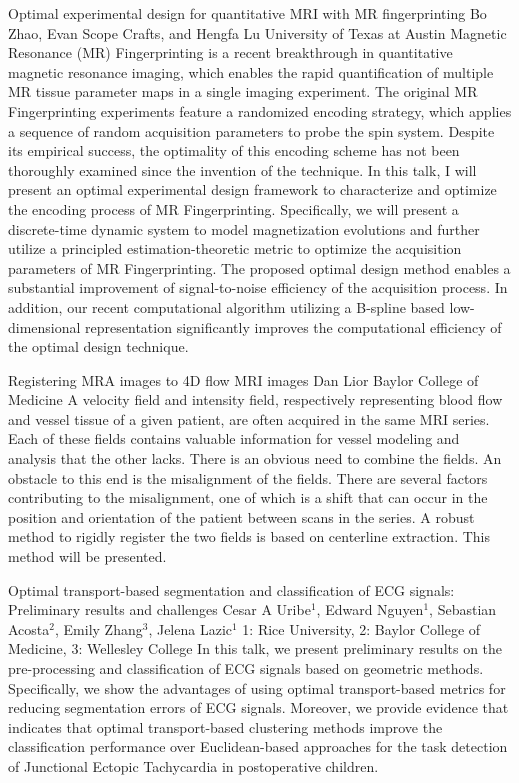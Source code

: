 \begin{addmargin}[2em]{0em}
\vspace{1.5ex}
\abs
{Optimal experimental design for quantitative MRI with MR fingerprinting}
{Bo Zhao, Evan Scope Crafts, and Hengfa Lu}
{University of Texas at Austin}
{Magnetic Resonance (MR) Fingerprinting is a recent breakthrough in quantitative magnetic resonance imaging, which enables the rapid quantification of multiple MR tissue parameter maps in a single imaging experiment. The original MR Fingerprinting experiments feature a randomized encoding strategy, which applies a sequence of random acquisition parameters to probe the spin system. Despite its empirical success, the optimality of this encoding scheme has not been thoroughly examined since the invention of the technique. In this talk, I will present an optimal experimental design framework to characterize and optimize the encoding process of MR Fingerprinting. Specifically, we will present a discrete-time dynamic system to model magnetization evolutions and further utilize a principled estimation-theoretic metric to optimize the acquisition parameters of MR Fingerprinting. The proposed optimal design method enables a substantial improvement of signal-to-noise efficiency of the acquisition process. In addition, our recent computational algorithm utilizing a B-spline based low-dimensional representation significantly improves the computational efficiency of the optimal design technique.}


\vspace{1.5ex}
\abs
{Registering MRA images to 4D flow MRI images}
{Dan Lior}
{Baylor College of Medicine}
{A velocity field and intensity field, respectively representing blood flow and vessel tissue of a given patient, are often acquired in the same MRI series. Each of these fields contains valuable information for vessel modeling and analysis that the other lacks. There is an obvious need to combine the fields. An obstacle to this end is the misalignment of the fields. There are several factors contributing to the misalignment, one of which is a shift that can occur in the position and orientation of the patient between scans in the series. A robust method to rigidly register the two fields is based on centerline extraction. This method will be presented.}


\vspace{1.5ex}
\abs
{Optimal transport-based segmentation and classification of ECG signals: Preliminary results and challenges}
{Cesar A Uribe$^{1}$, Edward Nguyen$^{1}$, Sebastian Acosta$^{2}$, Emily Zhang$^{3}$, Jelena Lazic$^{1}$}
{1: Rice University, 2: Baylor College of Medicine, 3: Wellesley College}
{In this talk, we present preliminary results on the pre-processing and classification of ECG signals based on geometric methods. Specifically, we show the advantages of using optimal transport-based metrics for reducing segmentation errors of ECG signals. Moreover, we provide evidence that indicates that optimal transport-based clustering methods improve the classification performance over Euclidean-based approaches for the task detection of Junctional Ectopic Tachycardia in postoperative children.}



\end{addmargin}
